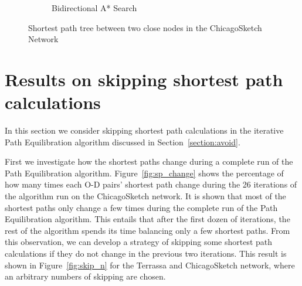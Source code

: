 \begin{figure}
\begin{subfigure}{.5\textwidth}
        \caption{Bidirectional A* Search}
        \label{fig:chicago_astar_bidirect2}
    \end{subfigure}
    \vspace{1em}
    \caption{Shortest path tree between two close nodes in the ChicagoSketch Network}
    \label{fig:short_sptree}
\end{figure}

\section{Results on skipping shortest path calculations}
In this section we consider skipping shortest path calculations in the iterative Path Equilibration algorithm discussed in Section~\ref{section:avoid}.

First we investigate how the shortest paths change during a complete run of the Path Equilibration algorithm.
Figure~\ref{fig:sp_change} shows 
the percentage of how many times each O-D pairs' shortest path change during the 26 iterations of the algorithm run on the ChicagoSketch network.
It is shown that most of the shortest paths only change a few times during the complete run of the Path Equilibration algorithm.
This entails that after the first dozen of iterations,
the rest of the algorithm spends its time balancing only a few shortest paths.
From this observation,
we can develop a strategy of skipping some shortest path calculations
if they do not change in the previous two iterations.
This result is shown in Figure~\ref{fig:skip_n} for the Terrassa and ChicagoSketch network, 
where an arbitrary numbers of skipping are chosen.

